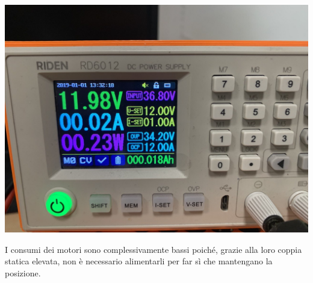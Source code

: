 \begin{center}
\includegraphics[scale=0.3]{figures/image1.png}
\captionsetup{type=figure}
\end{center}

I consumi dei motori sono complessivamente bassi poiché, grazie alla loro coppia statica elevata, non è necessario
alimentarli per far sì che mantengano la posizione.
